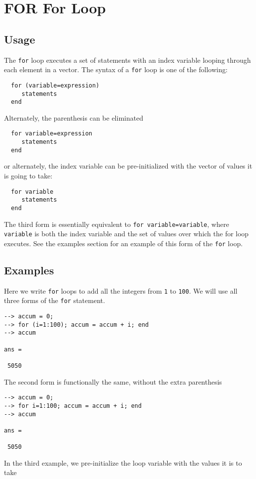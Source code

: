 \section{FOR For Loop}

\subsection{Usage}

The \verb|for| loop executes a set of statements with an 
index variable looping through each element in a vector.
The syntax of a \verb|for| loop is one of the following:
\begin{verbatim}
  for (variable=expression)
     statements
  end
\end{verbatim}
Alternately, the parenthesis can be eliminated
\begin{verbatim}
  for variable=expression
     statements
  end
\end{verbatim}
or alternately, the index variable can be pre-initialized
with the vector of values it is going to take:
\begin{verbatim}
  for variable
     statements
  end
\end{verbatim}
The third form is essentially equivalent to \verb|for variable=variable|,
where \verb|variable| is both the index variable and the set of values
over which the for loop executes.  See the examples section for
an example of this form of the \verb|for| loop.
\subsection{Examples}

Here we write \verb|for| loops to add all the integers from
\verb|1| to \verb|100|.  We will use all three forms of the \verb|for|
statement.
\begin{verbatim}
--> accum = 0;
--> for (i=1:100); accum = accum + i; end
--> accum

ans = 

 5050 
\end{verbatim}
The second form is functionally the same, without the
extra parenthesis
\begin{verbatim}
--> accum = 0;
--> for i=1:100; accum = accum + i; end
--> accum

ans = 

 5050 
\end{verbatim}
In the third example, we pre-initialize the loop variable
with the values it is to take
\begin{verbatim}

\end{verbatim}
